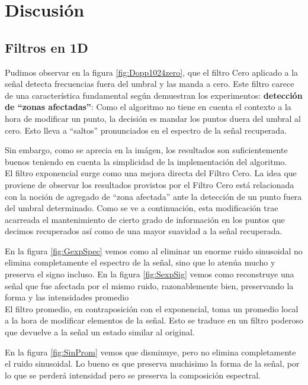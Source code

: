 \section{Discusi\'on}

\subsection{Filtros en 1D}

Pudimos observar en la figura \ref{fig:Dopp1024zero}, que el filtro Cero
aplicado a la se\~nal detecta frecuencias fuera del umbral y
las manda a cero. Este filtro carece de una caracter\'istica fundamental
seg\'un demuestran los experimentos:
{\bf detecci\'on de ``zonas afectadas''}: Como el algoritmo no tiene en
cuenta el contexto a la hora de modificar un punto, la decisi\'on es mandar los
puntos duera del umbral al cero. Esto lleva a ``saltos'' pronunciados en
el espectro de la se\~nal recuperada.

Sin embargo, como se aprecia en la im\'agen, los resultados son suficientemente
buenos teniendo en cuenta la simplicidad de la implementaci\'on del algoritmo.\\

El filtro exponencial surge como una mejora directa del Filtro Cero.
La idea que proviene de
observar los resultados provistos por el Filtro Cero est\'a relacionada con la
noci\'on de agregado de ``zona afectada'' ante la detecci\'on de un punto fuera
del umbral determinado. Como se ve a continuaci\'on, esta modificaci\'on trae
acarreada el mantenimiento de cierto grado de informaci\'on en los puntos que
decimos recuperados as\'i como de una mayor suavidad a la se\~nal recuperada.

En la figura \ref{fig:GexpSpec} vemos como al eliminar un enorme ruido
sinusoidal no elimina completamente el espectro de la se\~nal, sino que
lo aten\'ua mucho y preserva el signo incluso. En la figura \ref{fig:SexpSig} vemos
como reconstruye una se\~nal que fue afectada por el mismo ruido, razonablemente
bien, preservando la forma y las intensidades promedio\\


El filtro promedio, en contraposici\'on con el exponencial, toma un promedio
local a la hora de modificar elementos de la se\~nal. Esto se traduce en un
filtro poderoso que devuelve a la se\~nal un estado similar al original.

En la figura \ref{fig:SinProm} vemos que disminuye, pero no elimina completamente
el ruido sinusoidal. Lo bueno es que preserva muchisimo la forma de la
se\~nal, por lo que se perder\'a intensidad pero se preserva la composici\'on
espectral.\\


